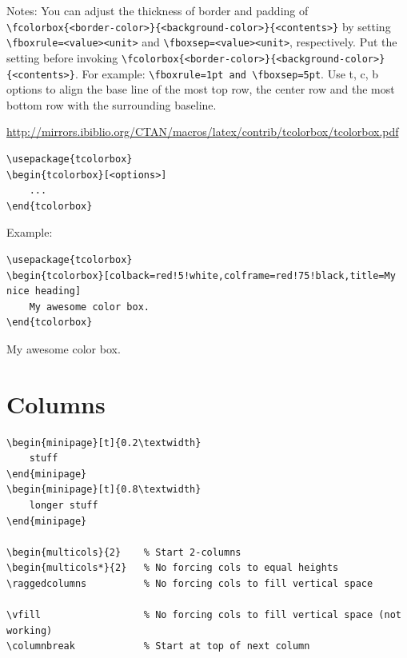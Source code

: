 \documentclass{article}
\begin{document}
Notes:
You can adjust the thickness of border and padding of
\verb|\fcolorbox{<border-color>}{<background-color>}{<contents>}|
by setting \verb|\fboxrule=<value><unit>| and
\verb|\fboxsep=<value><unit>|, respectively. Put the setting
before invoking
\verb|\fcolorbox{<border-color>}{<background-color>}{<contents>}|.
For example: \verb|\fboxrule=1pt and \fboxsep=5pt|. Use
\textrm{t}, \textrm{c}, \textrm{b}
options to align the base line of the most top row,
the center row and the most bottom row with the surrounding baseline.

\url{http://mirrors.ibiblio.org/CTAN/macros/latex/contrib/tcolorbox/tcolorbox.pdf}
\begin{lstlisting}
\usepackage{tcolorbox}
\begin{tcolorbox}[<options>]
    ...
\end{tcolorbox}
\end{lstlisting}

Example:
\begin{lstlisting}
\usepackage{tcolorbox}
\begin{tcolorbox}[colback=red!5!white,colframe=red!75!black,title=My nice heading]
    My awesome color box.
\end{tcolorbox}
\end{lstlisting}
\begin{tcolorbox}[colback=red!5!white,colframe=red!75!black,title=My nice heading]
    My awesome color box.
\end{tcolorbox}


\section{Columns}
\begin{verbatim}
\begin{minipage}[t]{0.2\textwidth}
    stuff
\end{minipage}
\begin{minipage}[t]{0.8\textwidth}
    longer stuff
\end{minipage}

\begin{multicols}{2}    % Start 2-columns
\begin{multicols*}{2}   % No forcing cols to equal heights
\raggedcolumns          % No forcing cols to fill vertical space

\vfill                  % No forcing cols to fill vertical space (not working)
\columnbreak            % Start at top of next column
\end{verbatim}
\end{document}
